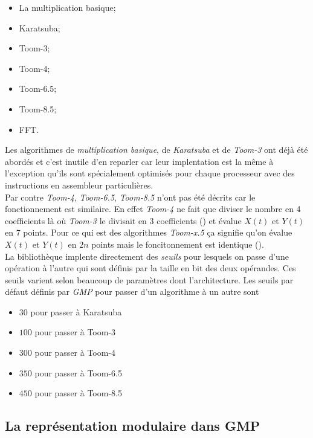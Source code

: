 \documentclass[letterpaper]{article}
\begin{document}
\begin{itemize}
  \item La multiplication basique;
  \item Karatsuba;
  \item Toom-3;
  \item Toom-4;
  \item Toom-6.5;
  \item Toom-8.5;
  \item FFT.
\end{itemize}

Les algorithmes de \emph{multiplication basique}, de \emph{Karatsuba} et de
\emph{Toom-3} ont déjà été abordés et c'est inutile d'en reparler car leur
implentation est la même à l'exception qu'ils sont spécialement optimisés pour
chaque processeur avec des instructions en assembleur particulières.\\

Par contre \emph{Toom-4}, \emph{Toom-6.5}, \emph{Toom-8.5} n'ont pas été
décrits car le fonctionnement est similaire. En effet \emph{Toom-4} ne
fait que diviser le nombre en 4 coefficients là où \emph{Toom-3} le divisait en
3 coefficients (\cite{gmplibtoom4}) et évalue $X(t)$ et $Y(t)$ en 7 points.
Pour ce qui est des algorithmes \emph{Toom-x.5} ça signifie qu'on évalue $X(t)$
et $Y(t)$ en $2n$ points mais le foncitonnement est identique
(\cite{gmplibtoomhalf}).\\

La bibliothèque implente directement des \emph{seuils} pour lesquels
on passe d'une opération à l'autre qui sont définis par la taille en bit des
deux opérandes. Ces seuils varient selon beaucoup de paramètres dont
l'architecture. Les seuils par défaut définis par \emph{GMP} pour passer d'un
algorithme à un autre sont

\begin{itemize}
  \item $30$ pour passer à Karatsuba
  \item $100$ pour passer à Toom-3
  \item $300$ pour passer à Toom-4
  \item $350$ pour passer à Toom-6.5
  \item $450$ pour passer à Toom-8.5
\end{itemize}

\subsection{La représentation modulaire dans GMP}
\end{document}
